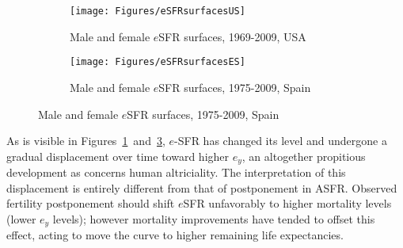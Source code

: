 \begin{figure}
        \centering
        \begin{subfigure}
                \centering
                \caption{Male and female $e$SFR surfaces, 1969-2009, USA}
                \texttt{[image: Figures/eSFRsurfacesUS]}
                \label{fig:exSFRsurfUS}
        \end{subfigure}
        \begin{subfigure}
                \centering
                \caption{Male and female $e$SFR surfaces, 1975-2009, Spain}
                \texttt{[image: Figures/eSFRsurfacesES]} 
                \label{fig:exSFRsurfES}
        \end{subfigure}
\end{figure}

As is visible in Figures~\ref{fig:exSFRsurfUS}~and~\ref{fig:exSFRsurfES}, 
$e$-SFR has changed its level and undergone a gradual displacement over 
time toward higher $e_y$, an altogether propitious development
as concerns human altriciality. The interpretation of this displacement is
entirely different from that of postponement in ASFR. Observed fertility 
postponement should shift $e$SFR unfavorably to higher mortality 
levels (lower $e_y$ levels); however mortality improvements have tended to 
offset this effect, acting to move the curve to higher
remaining life expectancies. 

 \FloatBarrier